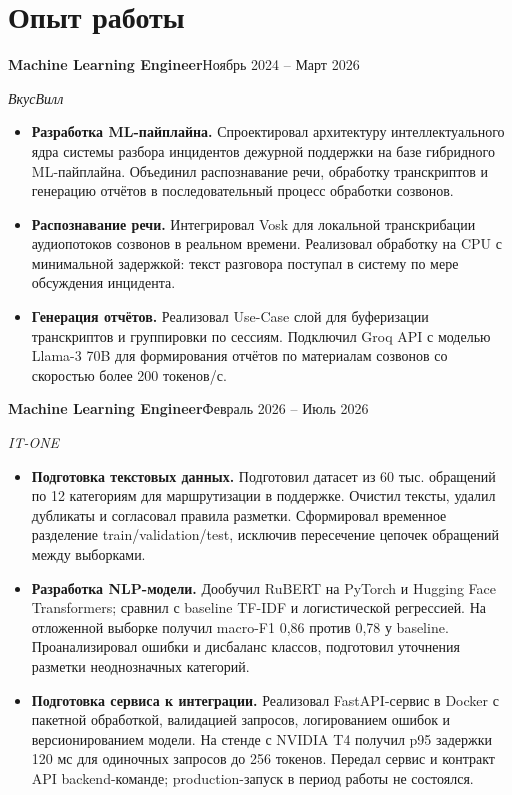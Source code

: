 \documentclass[a4paper,11pt]{article}
\newcommand{\entry}[3]{\textbf{#1}\hfill #3\par\textit{#2}\par}
\begin{document}
\section*{Опыт работы}
\fontsize{10.5}{11.9}\selectfont
\entry{Machine Learning Engineer}{ВкусВилл}{Ноябрь 2024 -- Март 2026}
\begin{itemize}
\item \textbf{Разработка ML-пайплайна.} Спроектировал архитектуру интеллектуального ядра системы разбора инцидентов дежурной поддержки на базе гибридного ML-пайплайна. Объединил распознавание речи, обработку транскриптов и генерацию отчётов в последовательный процесс обработки созвонов.
\item \textbf{Распознавание речи.} Интегрировал Vosk для локальной транскрибации аудиопотоков созвонов в реальном времени. Реализовал обработку на CPU с минимальной задержкой: текст разговора поступал в систему по мере обсуждения инцидента.
\item \textbf{Генерация отчётов.} Реализовал Use-Case слой для буферизации транскриптов и группировки по сессиям. Подключил Groq API с моделью Llama-3 70B для формирования отчётов по материалам созвонов со скоростью более 200 токенов/с.
\end{itemize}
\vspace{4pt}
\entry{Machine Learning Engineer}{IT-ONE}{Февраль 2026 -- Июль 2026}
\begin{itemize}
\item \textbf{Подготовка текстовых данных.} Подготовил датасет из 60 тыс. обращений по 12 категориям для маршрутизации в поддержке. Очистил тексты, удалил дубликаты и согласовал правила разметки. Сформировал временное разделение train/validation/test, исключив пересечение цепочек обращений между выборками.
\item \textbf{Разработка NLP-модели.} Дообучил RuBERT на PyTorch и Hugging Face Transformers; сравнил с baseline TF-IDF и логистической регрессией. На отложенной выборке получил macro-F1 0,86 против 0,78 у baseline. Проанализировал ошибки и дисбаланс классов, подготовил уточнения разметки неоднозначных категорий.
\item \textbf{Подготовка сервиса к интеграции.} Реализовал FastAPI-сервис в Docker с пакетной обработкой, валидацией запросов, логированием ошибок и версионированием модели. На стенде с NVIDIA T4 получил p95 задержки 120 мс для одиночных запросов до 256 токенов. Передал сервис и контракт API backend-команде; production-запуск в период работы не состоялся.
\end{itemize}
\end{document}
